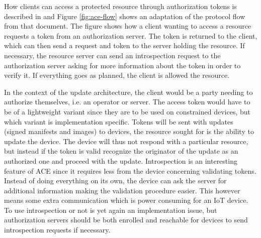\documentclass[0-thesis.tex]{subfiles}
\begin{document}
How clients can access a protected resource through authorization tokens is described in
\parencite{ace} and Figure \ref{fig:ace-flow} shows an adaptation of the protocol flow
from that document. The figure shows how a client wanting to access a resource requests a
token from an authorization server. The token is returned to the client, which can then
send a request and token to the server holding the resource. If necessary, the resource
server can send an introspection request to the authorization server asking for more
information about the token in order to verify it. If everything goes as planned, the
client is allowed the resource.

In the context of the update architecture, the client would be a party needing to
authorize themselves, i.e. an operator or server. The access token would have to be of a
lightweight variant since they are to be used on constrained devices, but which variant is
implementation specific. Tokens will be sent with updates (signed manifests and images) to
devices, the resource sought for is the ability to update the device. The device will thus
not respond with a particular resource, but instead if the token is valid recognize the
originator of the update as an authorized one and proceed with the update. Introspection
is an interesting feature of ACE since it requires less from the device concerning
validating tokens. Instead of doing everything on its own, the device can ask the server
for additional information making the validation procedure easier. This however means some
extra communication which is power consuming for an IoT device. To use introspection or
not is yet again an implementation issue, but authorization servers should be both
enrolled and reachable for devices to send introspection requests if necessary.
\end{document}
